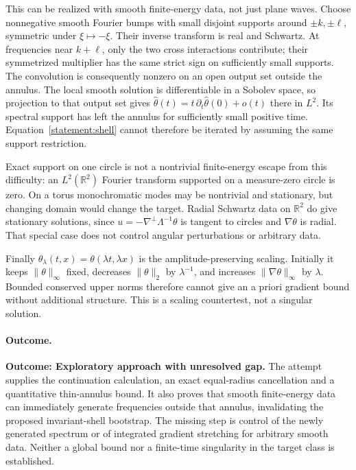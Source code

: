 \documentclass[11pt,a4paper]{article}
\newcommand{\R}{\mathbb{R}}
\numberwithin{equation}{section}
\begin{document}
This can be realized with smooth finite-energy data, not just plane waves.
Choose nonnegative smooth Fourier bumps with small disjoint supports around
$\pm k,\pm\ell$, symmetric under $\xi\mapsto-\xi$. Their inverse transform
is real and Schwartz. At frequencies near $k+\ell$, only the two cross
interactions contribute; their symmetrized multiplier has the same strict
sign on sufficiently small supports. The convolution is consequently
nonzero on an open output set outside the annulus. The local smooth solution
is differentiable in a Sobolev space, so projection to that output set gives
$\widehat\theta(t)=t\,\partial_t\widehat\theta(0)+o(t)$ there in $L^2$.
Its spectral support has left the annulus for sufficiently small positive
time. Equation~\eqref{statement:shell} cannot therefore be iterated by assuming
the same support restriction.

Exact support on one circle is not a nontrivial finite-energy escape from
this difficulty: an $L^2(\R^2)$ Fourier transform supported on a
measure-zero circle is zero. On a torus monochromatic modes may be
nontrivial and stationary, but changing domain would change the target.
Radial Schwartz data on $\R^2$ do give stationary solutions, since
$u=-\nabla^\perp\Lambda^{-1}\theta$ is tangent to circles and
$\nabla\theta$ is radial. That special case does not control angular
perturbations or arbitrary data.

Finally $\theta_\lambda(t,x)=\theta(\lambda t,\lambda x)$ is the
amplitude-preserving scaling. Initially it keeps $\|\theta\|_\infty$
fixed, decreases $\|\theta\|_2$ by $\lambda^{-1}$, and increases
$\|\nabla\theta\|_\infty$ by $\lambda$. Bounded conserved upper norms
therefore cannot give an a priori gradient bound without additional
structure. This is a scaling countertest, not a singular solution.

\paragraph{Outcome.}
\textbf{Outcome: Exploratory approach with unresolved gap.}
The attempt supplies the continuation calculation, an exact equal-radius
cancellation and a quantitative thin-annulus bound. It also proves that
smooth finite-energy data can immediately generate frequencies outside that
annulus, invalidating the proposed invariant-shell bootstrap. The missing
step is control of the newly generated spectrum or of integrated gradient
stretching for arbitrary smooth data. Neither a global bound nor a
finite-time singularity in the target class is established.
\end{document}
